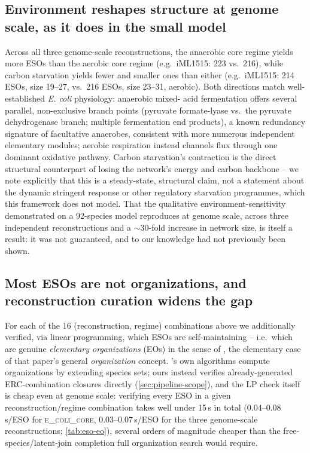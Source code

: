 \documentclass[nocrop]{bioinfo}
\begin{document}
\subsection{Environment reshapes structure at genome scale, as it does in the small model}
\label{sec:environment-regime}
Across all three genome-scale reconstructions, the anaerobic core regime yields more ESOs than
the aerobic core regime (e.g.\ iML1515: 223 vs.\ 216), while carbon starvation yields fewer and
smaller ones than either (e.g.\ iML1515: 214 ESOs, size 19--27, vs.\ 216 ESOs, size 23--31,
aerobic). Both directions match well-established \textit{E. coli} physiology: anaerobic mixed-
acid fermentation offers several parallel, non-exclusive branch points (pyruvate formate-lyase
vs.\ the pyruvate dehydrogenase branch; multiple fermentation end products), a known redundancy
signature of facultative anaerobes, consistent with more numerous independent elementary
modules; aerobic respiration instead channels flux through one dominant oxidative pathway.
Carbon starvation's contraction is the direct structural counterpart of losing the network's
energy and carbon backbone -- we note explicitly that this is a steady-state, structural claim,
not a statement about the dynamic stringent response or other regulatory starvation programmes,
which this framework does not model. That the qualitative environment-sensitivity
\citeauthor{centler2006} demonstrated on a 92-species model reproduces at genome scale, across
three independent reconstructions and a $\sim$30-fold increase in network size, is itself a
result: it was not guaranteed, and to our knowledge had not previously been shown.

\subsection{Most ESOs are not organizations, and reconstruction curation widens the gap}
\label{sec:eso-eo}
For each of the 16 (reconstruction, regime) combinations above we additionally verified, via
linear programming, which ESOs are self-maintaining -- i.e.\ which are genuine \emph{elementary
organizations} (EOs) in the sense of \citet{centler2008computing}, the elementary case of that
paper's general \emph{organization} concept. \citeauthor{centler2008computing}'s own algorithms
compute organizations by extending species sets; ours instead verifies already-generated
ERC-combination closures directly (\cref{sec:pipeline-scope}), and the LP check itself is cheap
even at genome scale: verifying every ESO in a given reconstruction/regime combination takes
well under 15\,s in total (0.04--0.08\,s/ESO for \textsc{e\_coli\_core}, 0.03--0.07\,s/ESO for
the three genome-scale reconstructions; \cref{tab:eso-eo}), several orders of magnitude cheaper
than the free-species/latent-join completion full organization search would require.
\end{document}
